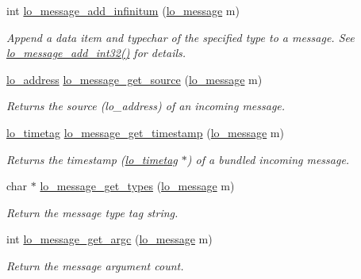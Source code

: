 \begin{DoxyCompactItemize}
int \hyperlink{group__liblolowlevel_ga4cbd7d3834a67446b15f53acf316a72a}{lo\+\_\+message\+\_\+add\+\_\+infinitum} (\hyperlink{lo__types_8h_ad126083c98d941f00eb72d1690b38d63}{lo\+\_\+message} m)
\begin{DoxyCompactList}\small\item\em Append a data item and typechar of the specified type to a message. See \hyperlink{group__liblolowlevel_ga7c9df1bd975a32fb6c8105e6fe327149}{lo\+\_\+message\+\_\+add\+\_\+int32()} for details. \end{DoxyCompactList}\item 
\hyperlink{lo__types_8h_abf9b53223467de596b89e1377b0f3f3d}{lo\+\_\+address} \hyperlink{group__liblolowlevel_ga1f4e07e4f8b67edc98f4b300412a3dbb}{lo\+\_\+message\+\_\+get\+\_\+source} (\hyperlink{lo__types_8h_ad126083c98d941f00eb72d1690b38d63}{lo\+\_\+message} m)
\begin{DoxyCompactList}\small\item\em Returns the source (lo\+\_\+address) of an incoming message. \end{DoxyCompactList}\item 
\hyperlink{structlo__timetag}{lo\+\_\+timetag} \hyperlink{group__liblolowlevel_ga164e068064afa94454eb6515b9b1748d}{lo\+\_\+message\+\_\+get\+\_\+timestamp} (\hyperlink{lo__types_8h_ad126083c98d941f00eb72d1690b38d63}{lo\+\_\+message} m)
\begin{DoxyCompactList}\small\item\em Returns the timestamp (\hyperlink{structlo__timetag}{lo\+\_\+timetag} $\ast$) of a bundled incoming message. \end{DoxyCompactList}\item 
char $\ast$ \hyperlink{group__liblolowlevel_gad3c1a312fd90bb4c35a4c1fac2d0b25d}{lo\+\_\+message\+\_\+get\+\_\+types} (\hyperlink{lo__types_8h_ad126083c98d941f00eb72d1690b38d63}{lo\+\_\+message} m)
\begin{DoxyCompactList}\small\item\em Return the message type tag string. \end{DoxyCompactList}\item 
int \hyperlink{group__liblolowlevel_ga5b391362eda2c6019011f3db55049db3}{lo\+\_\+message\+\_\+get\+\_\+argc} (\hyperlink{lo__types_8h_ad126083c98d941f00eb72d1690b38d63}{lo\+\_\+message} m)
\begin{DoxyCompactList}\small\item\em Return the message argument count. \end{DoxyCompactList}\item 

\end{DoxyCompactItemize}
